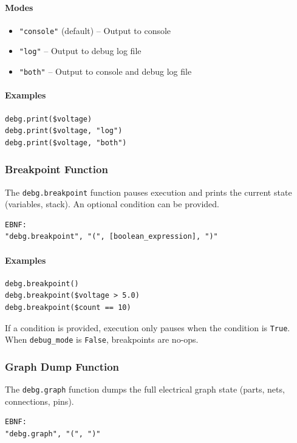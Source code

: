 \paragraph{Modes}
\begin{itemize}
\item \texttt{"console"} (default) -- Output to console
\item \texttt{"log"} -- Output to debug log file
\item \texttt{"both"} -- Output to console and debug log file
\end{itemize}

\paragraph{Examples}
\begin{verbatim}
debg.print($voltage)
debg.print($voltage, "log")
debg.print($voltage, "both")
\end{verbatim}

\subsubsection{Breakpoint Function}
The \texttt{debg.breakpoint} function pauses execution and prints the current state (variables, stack). An optional condition can be provided.
\begin{verbatim}
EBNF:
"debg.breakpoint", "(", [boolean_expression], ")"
\end{verbatim}

\paragraph{Examples}
\begin{verbatim}
debg.breakpoint()
debg.breakpoint($voltage > 5.0)
debg.breakpoint($count == 10)
\end{verbatim}

If a condition is provided, execution only pauses when the condition is \texttt{True}. When \texttt{debug\_mode} is \texttt{False}, breakpoints are no-ops.

\subsubsection{Graph Dump Function}
The \texttt{debg.graph} function dumps the full electrical graph state (parts, nets, connections, pins).
\begin{verbatim}
EBNF:
"debg.graph", "(", ")"
\end{verbatim}

